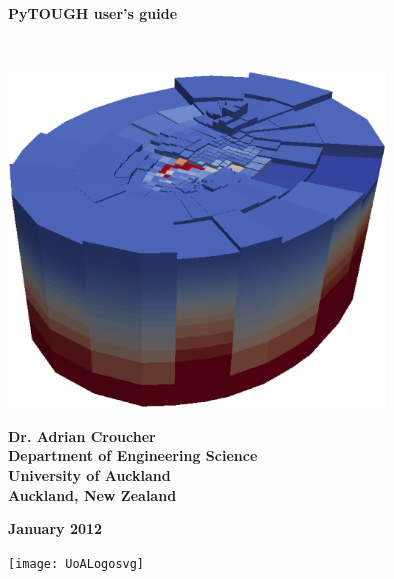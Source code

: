 \begin{titlepage}

\begin{center}

\bigskip\

\textbf{\Huge{PyTOUGH user's guide}}

\bigskip\

\includegraphics[width=0.75\textwidth]{coverpic}

\bigskip

\textbf{\large{Dr. Adrian Croucher\\
Department of Engineering Science\\
University of Auckland\\
Auckland, New Zealand}}

\bigskip

\textbf{\large{January 2012}}

\bigskip
\bigskip
\bigskip
\bigskip
\bigskip

\texttt{[image: UoALogosvg]}

\end{center}
\end{titlepage}

